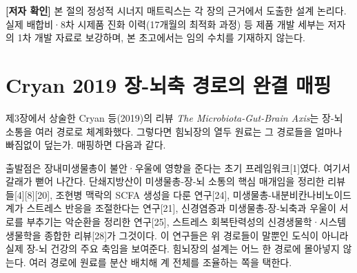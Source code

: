 \documentclass[12pt,oneside]{book}
\newenvironment{authnote}
  {\par\smallskip\begingroup\leftskip=6mm\rightskip=3mm\small\color{muted}\noindent\ignorespaces}
  {\par\endgroup\smallskip}
\begin{document}
\begin{authnote}\textbf{[저자 확인]} 본 절의 정성적 시너지 매트릭스는 각 장의 근거에서 도출한 설계 논리다. 실제 배합비·8차 시제품 진화 이력(17개월의 최적화 과정) 등 제품 개발 세부는 저자의 1차 개발 자료로 보강하며, 본 초고에서는 임의 수치를 기재하지 않는다.\end{authnote}

\section{Cryan 2019 장-뇌축 경로의 완결 매핑}

제3장에서 상술한 Cryan 등(2019)의 리뷰 \textit{The Microbiota-Gut-Brain Axis}는 장-뇌 소통을 여러 경로로 체계화했다. 그렇다면 힘뇌장의 열두 원료는 그 경로들을 얼마나 빠짐없이 덮는가. 매핑하면 다음과 같다.

\vspace{2pt}\vspace{3pt}

출발점은 장내미생물총이 불안·우울에 영향을 준다는 초기 프레임워크[1]였다. 여기서 갈래가 뻗어 나간다. 단쇄지방산이 미생물총-장-뇌 소통의 핵심 매개임을 정리한 리뷰들[4][8][20], 조현병 맥락의 SCFA 생성을 다룬 연구[24], 미생물총-내분비칸나비노이드계가 스트레스 반응을 조절한다는 연구[21], 신경염증과 미생물총-장-뇌축과 우울이 서로를 부추기는 악순환을 정리한 연구[25], 스트레스 회복탄력성의 신경생물학·시스템생물학을 종합한 리뷰[28]가 그것이다. 이 연구들은 위 경로들이 말뿐인 도식이 아니라 실제 장-뇌 건강의 주요 축임을 보여준다. 힘뇌장의 설계는 어느 한 경로에 몰아넣지 않는다. 여러 경로에 원료를 분산 배치해 계 전체를 조율하는 쪽을 택한다.
\end{document}
